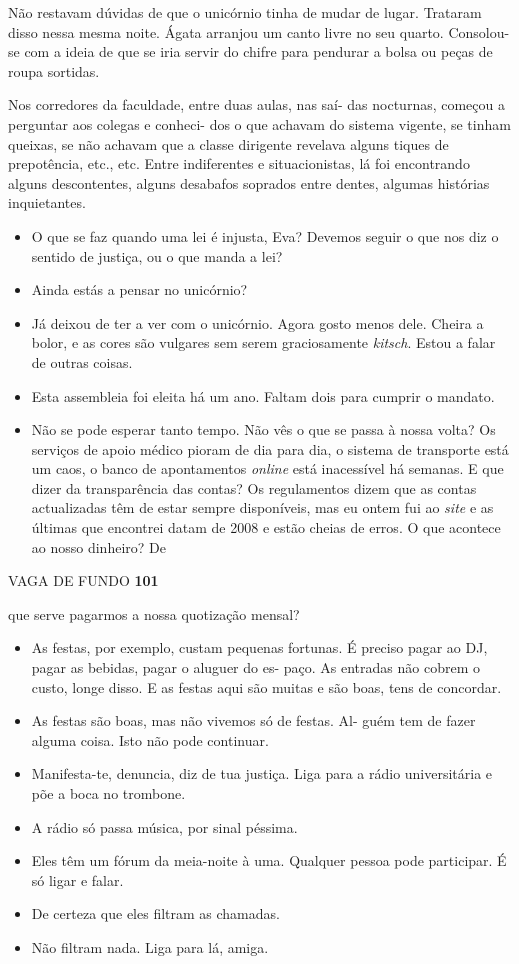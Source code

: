 Não restavam dúvidas de que o unicórnio tinha de mudar de lugar.
Trataram disso nessa mesma noite. Ágata arranjou um canto livre no seu
quarto. Consolou-se com a ideia de que se iria servir do chifre para
pendurar a bolsa ou peças de roupa sortidas.

Nos corredores da faculdade, entre duas aulas, nas saí- das nocturnas,
começou a perguntar aos colegas e conheci- dos o que achavam do sistema
vigente, se tinham queixas, se não achavam que a classe dirigente
revelava alguns tiques de prepotência, etc., etc. Entre indiferentes e
situacionistas, lá foi encontrando alguns descontentes, alguns desabafos
soprados entre dentes, algumas histórias inquietantes.

\begin{itemize}
\tightlist
\item
  O que se faz quando uma lei é injusta, Eva? Devemos seguir o que nos
  diz o sentido de justiça, ou o que manda a lei?
\item
  Ainda estás a pensar no unicórnio?
\item
  Já deixou de ter a ver com o unicórnio. Agora gosto menos dele. Cheira
  a bolor, e as cores são vulgares sem serem graciosamente
  \emph{kitsch}. Estou a falar de outras coisas.
\item
  Esta assembleia foi eleita há um ano. Faltam dois para cumprir o
  mandato.
\item
  Não se pode esperar tanto tempo. Não vês o que se passa à nossa volta?
  Os serviços de apoio médico pioram de dia para dia, o sistema de
  transporte está um caos, o banco de apontamentos \emph{online }está
  inacessível há semanas. E que dizer da transparência das contas? Os
  regulamentos dizem que as contas actualizadas têm de estar sempre
  disponíveis, mas eu ontem fui ao \emph{site }e as últimas que
  encontrei datam de 2008 e estão cheias de erros. O que acontece ao
  nosso dinheiro? De
\end{itemize}

VAGA DE FUNDO \textbf{101}

que serve pagarmos a nossa quotização mensal?

\begin{itemize}
\tightlist
\item
  As festas, por exemplo, custam pequenas fortunas. É preciso pagar ao
  DJ, pagar as bebidas, pagar o aluguer do es- paço. As entradas não
  cobrem o custo, longe disso. E as festas aqui são muitas e são boas,
  tens de concordar.
\item
  As festas são boas, mas não vivemos só de festas. Al- guém tem de
  fazer alguma coisa. Isto não pode continuar.
\item
  Manifesta-te, denuncia, diz de tua justiça. Liga para a rádio
  universitária e põe a boca no trombone.
\item
  A rádio só passa música, por sinal péssima.
\item
  Eles têm um fórum da meia-noite à uma. Qualquer pessoa pode
  participar. É só ligar e falar.
\item
  De certeza que eles filtram as chamadas.
\item
  Não filtram nada. Liga para lá, amiga.
\end{itemize}

